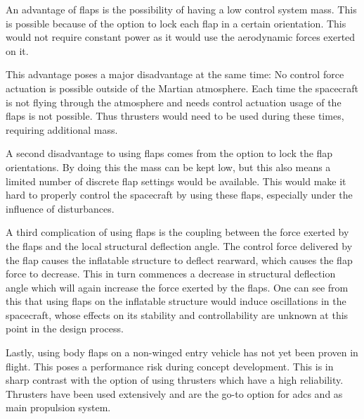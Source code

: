 An advantage of flaps is the possibility of having a low control system mass. This is possible because of the option to lock each flap in a certain orientation. This would not require constant power as it would use the aerodynamic forces exerted on it.

This advantage poses a major disadvantage at the same time: No control force actuation is possible outside of the Martian atmosphere. Each time the spacecraft is not flying through the atmosphere and needs control actuation usage of the flaps is not possible. Thus thrusters would need to be used during these times, requiring additional mass.

A second disadvantage to using flaps comes from the option to lock the flap orientations. By doing this the mass can be kept low, but this also means a limited number of discrete flap settings would be available. This would make it hard to properly control the spacecraft by using these flaps, especially under the influence of disturbances.

A third complication of using flaps is the coupling between the force exerted by the flaps and the local structural deflection angle. The control force delivered by the flap causes the inflatable structure to deflect rearward, which causes the flap force to decrease. This in turn commences a decrease in structural deflection angle which will again increase the force exerted by the flaps. One can see from this that using flaps on the inflatable structure would induce oscillations in the spacecraft, whose effects on its stability and controllability are unknown at this point in the design process.

Lastly, using body flaps on a non-winged entry vehicle has not yet been proven in flight. This poses a performance risk during concept development. This is in sharp contrast with the option of using thrusters which have a high reliability. Thrusters have been used extensively and are the go-to option for \gls{adcs} and as main propulsion system.
